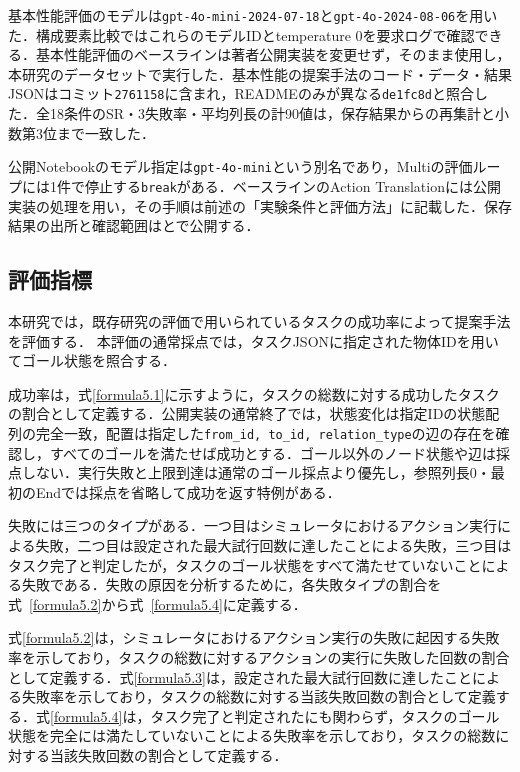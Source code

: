基本性能評価のモデルは\texttt{gpt-4o-mini-2024-07-18}と\texttt{gpt-4o-2024-08-06}を用いた．構成要素比較ではこれらのモデルIDとtemperature 0を要求ログで確認できる．基本性能評価のベースラインは著者公開実装を変更せず，そのまま使用し，本研究のデータセットで実行した．基本性能の提案手法のコード・データ・結果JSONはコミット\texttt{2761158}に含まれ，READMEのみが異なる\texttt{de1fc8d}と照合した．全18条件のSR・3失敗率・平均列長の計90値は，保存結果からの再集計と小数第3位まで一致した．


公開Notebookのモデル指定は\texttt{gpt-4o-mini}という別名であり，Multiの評価ループには1件で停止する\texttt{break}がある．ベースラインのAction Translationには公開実装の処理を用い，その手順は前述の「実験条件と評価方法」に記載した．保存結果の出所と確認範囲はとで公開する．

\subsection{評価指標}\label{sec5.3}

本研究では，既存研究\cite{ALFRED20,song2023llm}の評価で用いられているタスクの成功率によって提案手法を評価する．
本評価の通常採点では，タスクJSONに指定された物体IDを用いてゴール状態を照合する．

成功率は，式\ref{formula5.1}に示すように，タスクの総数に対する成功したタスクの割合として定義する．公開実装の通常終了では，状態変化は指定IDの状態配列の完全一致，配置は指定した\texttt{from\_id, to\_id, relation\_type}の辺の存在を確認し，すべてのゴールを満たせば成功とする．ゴール以外のノード状態や辺は採点しない．実行失敗と上限到達は通常のゴール採点より優先し，参照列長0・最初のEndでは採点を省略して成功を返す特例がある．

失敗には三つのタイプがある．一つ目はシミュレータにおけるアクション実行による失敗，二つ目は設定された最大試行回数に達したことによる失敗，三つ目はタスク完了と判定したが，タスクのゴール状態をすべて満たせていないことによる失敗である．失敗の原因を分析するために，各失敗タイプの割合を式~\ref{formula5.2}から式~\ref{formula5.4}に定義する．

式\ref{formula5.2}は，シミュレータにおけるアクション実行の失敗に起因する失敗率を示しており，タスクの総数に対するアクションの実行に失敗した回数の割合として定義する．式\ref{formula5.3}は，設定された最大試行回数に達したことによる失敗率を示しており，タスクの総数に対する当該失敗回数の割合として定義する．式\ref{formula5.4}は，タスク完了と判定されたにも関わらず，タスクのゴール状態を完全には満たしていないことによる失敗率を示しており，タスクの総数に対する当該失敗回数の割合として定義する．

